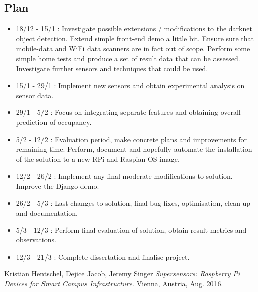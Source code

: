 \documentclass[11pt]{article}
\begin{document}
\subsection{Plan}\label{plan}
\begin{itemize}
  \item 18/12 - 15/1 : Investigate possible extensions / modifications to the darknet object detection. Extend simple front-end demo a little bit. Ensure sure that mobile-data and WiFi data scanners are in fact out of scope. Perform some simple home tests and produce a set of result data that can be assessed. Investigate further sensors and techniques that could be used.
  \item 15/1 - 29/1 : Implement new sensors and obtain experimental analysis on sensor data.
  \item 29/1 - 5/2 : Focus on integrating separate features and obtaining overall prediction of occupancy.
  \item 5/2 - 12/2 : Evaluation period, make concrete plans and improvements for remaining time. Perform, document and hopefully automate the installation of the solution to a new RPi and Raspian OS image.
  \item 12/2 - 26/2 : Implement any final moderate modifications to solution. Improve the Django demo.
  \item 26/2 - 5/3 : Last changes to solution, final bug fixes, optimisation, clean-up and documentation.
  \item 5/3 - 12/3 : Perform final evaluation of solution, obtain result metrics and observations.
  \item 12/3 - 21/3 : Complete dissertation and finalise project.
\end{itemize}

\begin{thebibliography}{9}
Kristian Hentschel, Dejice Jacob, Jeremy Singer 
\textit{ Supersensors: Raspberry Pi Devices for Smart Campus Infrastructure}. 
Vienna, Austria, Aug. 2016.
\end{thebibliography}
\end{document}
